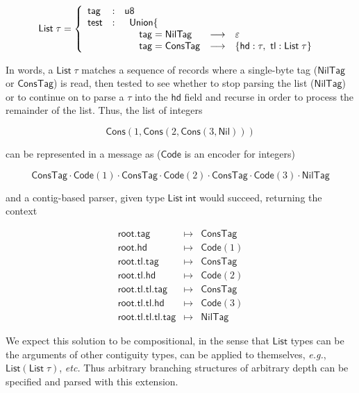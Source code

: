 \documentclass{article}
\newcommand{\eg}{\textit{e.g.}}
\newcommand{\etc}{\textit{etc.}}
\newcommand{\konst}[1]{\ensuremath{\mathsf{#1}}}
\theoremstyle{definition}
\begin{document}
\[
 \konst{List}\;\tau =
   \left\{
     \begin{array}{lcl}
       \konst{tag} & : & \konst{u8} \\
       \konst{test} & : &
       \begin{array}[t] {lcl}
         \konst{Union} \{ \\
         \quad \konst{tag} = \konst{NilTag} & \longrightarrow & \varepsilon \\
         \quad \konst{tag} = \konst{ConsTag} & \longrightarrow &
          \{ \konst{hd} : \tau, \ \konst{tl} : \konst{List}\; \tau \}
        \end{array}
     \end{array}
   \right.
\]

In words, a $\konst{List}\;\tau$ matches a sequence of records where
a single-byte tag (\konst{NilTag} or \konst{ConsTag}) is read, then tested to see
whether to stop parsing the list (\konst{NilTag}) or to continue on to
parse a $\tau$ into the \konst{hd} field and recurse in order to
process the remainder of the list. Thus, the list of integers

\[ \konst{Cons}(1, \konst{Cons}(2, \konst{Cons}(3, \konst{Nil}))) \]

can be represented in a message as (\konst{Code} is an encoder for integers)

\[ \konst{ConsTag}\cdot \konst{Code}(1) \cdot
   \konst{ConsTag}\cdot \konst{Code}(2) \cdot
   \konst{ConsTag}\cdot \konst{Code}(3) \cdot \konst{NilTag} \]

and a contig-based parser, given type $\konst{List}\; \konst{int}$
would succeed, returning the context

\[
\begin{array}{rcl}
\konst{root.tag} & \mapsto & \konst{ConsTag} \\
\konst{root.hd} & \mapsto & \konst{Code}(1) \\
\konst{root.tl.tag} & \mapsto & \konst{ConsTag} \\
\konst{root.tl.hd} & \mapsto & \konst{Code}(2) \\
\konst{root.tl.tl.tag} & \mapsto & \konst{ConsTag} \\
\konst{root.tl.tl.hd} & \mapsto & \konst{Code}(3) \\
\konst{root.tl.tl.tl.tag} & \mapsto & \konst{NilTag}
\end{array}
\]

We expect this solution to be compositional, in the sense that
\konst{List} types can be the arguments of other contiguity types, can
be applied to themselves, \eg, $\konst{List}(\konst{List}\;\tau)$,
\etc \; Thus arbitrary branching structures of arbitrary depth can be
specified and parsed with this extension.
\end{document}
